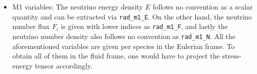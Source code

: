 \documentclass{article}
\newcommand{\var}[1]{%
  {\setlength{\fboxsep}{1.5pt}%
   \colorbox{varbg}{\textcolor{varfg}{\texttt{\small #1}}}}}
\begin{document}
\begin{itemize}
  $v^i$ is the 3-velocity in the Eulerian frame and $W$ the Lorentz factor. In GR-Athena++ the variable $\tilde{u}^i$ gets
  directly evolved and is defined as the projection of the 4-velocity $u^{\mu}$ onto the hypersurface $\Sigma_t$. This is important
  to know when computing the 4-velocity in some post-processing steps below. For the output of the Lorentz-weighted 3-velocity
  either $\langle\mathrm{hydro}\rangle$ or $\langle\mathrm{mhd}\rangle$ needs to exist.
  \item M1 variables: The neutrino energy density $E$ follows no convention as a scalar quantity and can be extracted via
  \var{rad\_m1\_E}. On the other hand, the neutrino number flux $F_i$ is given with lower indices as \var{rad\_m1\_F}, and lastly
  the neutrino number density also follows no convention as \var{rad\_m1\_N}. All the aforementioned variables are given per species
  in the Eulerian frame. To obtain all of them in the fluid frame, one would have to project the stress-energy tensor accordingly.
\end{itemize}
\end{document}
